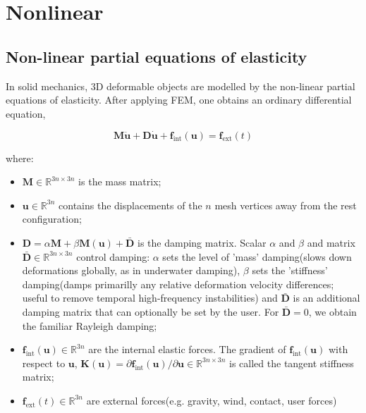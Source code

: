 
\chapter{Nonlinear}

\section{Non-linear partial equations of elasticity}
In solid mechanics, 3D deformable objects are modelled by the non-linear partial equations of elasticity. After applying FEM, one obtains an ordinary differential equation,

\begin{equation} \label{eq: fem_ode}
	\mathbf{M}\ddot{\mathbf{u}}+\mathbf{D}\dot{\mathbf{u}}+\mathbf{f}_{\mathrm{int}}(\mathbf{u})=\mathbf{f}_{\mathrm{ext}}(t)
\end{equation}

where:
\begin{itemize}
	\item $ \mathbf{M}\in \mathbb{R}^{3n\times 3n} $ is the mass matrix;
	\item $ \mathbf{u}\in \mathbb{R}^{3n} $ contains the displacements of the $ n $ mesh vertices away from the rest configuration;
	\item $ \mathbf{D}=\alpha \mathbf{M}+\beta \mathbf{M}(\mathbf{u})+\bar{\mathbf{D}} $ is the damping matrix. Scalar $ \alpha $ and $ \beta $ and matrix $ \bar{\mathbf{D}} \in \mathbb{R}^{3n \times 3n} $ control damping: $ \alpha $ sets the level of 'mass' damping(slows down deformations globally, as in underwater damping), $ \beta $ sets the 'stiffness' damping(damps primarilly any relative deformation velocity differences; useful to remove temporal high-frequency instabilities) and $ \bar{\mathbf{D}} $ is an additional damping matrix that can optionally be set by the user. For $ \bar{\mathbf{D}} = 0 $, we obtain the familiar Rayleigh damping;
	\item $ \mathbf{f}_{\mathrm{int}}(\mathbf{u})\in \mathbb{R}^{3n} $ are the internal elastic forces. The gradient of $ \mathbf{f}_{\mathrm{int}}(\mathbf{u}) $ with respect to $ \mathbf{u} $, $ \mathbf{K}(\mathbf{u})=\partial \mathbf{f}_{\mathrm{int}}(\mathbf{u})/\partial \mathbf{u} \in \mathbb{R}^{3n\times 3n} $ is called the tangent stiffness matrix;
	\item $ \mathbf{f}_{\mathrm{ext}}(t) \in \mathbb{R}^{3n} $ are external forces(e.g. gravity, wind, contact, user forces)
\end{itemize}


